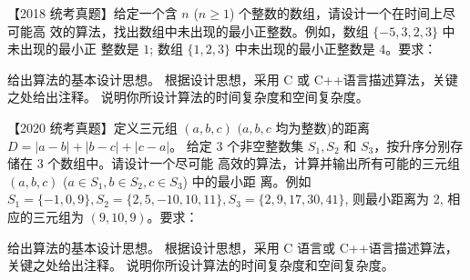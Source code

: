 \begin{qitems}
    \begin{bbox}
        \qitem 【2018 统考真题】给定一个含 $n$ ($n\geqslant 1$) 个整数的数组，请设计一个在时间上尽可能高
        效的算法，找出数组中未出现的最小正整数。例如，数组 $\{-5,3,2,3\}$ 中未出现的最小正
        整数是 $1$; 数组 $\{1,2,3\}$ 中未出现的最小正整数是 $4$。要求：
        \begin{subqitems}
            \subqitem 给出算法的基本设计思想。
            \subqitem 根据设计思想，采用 C 或 C++语言描述算法，关键之处给出注释。
            \subqitem 说明你所设计算法的时间复杂度和空间复杂度。
        \end{subqitems}
    \end{bbox}

    \begin{bbox}
        \qitem 【2020 统考真题】定义三元组 $(a,b,c)$ $(a,b,c$ 均为整数)的距离 $D=|a-b|+|b-c|+|c-a|$。
        给定 $3$ 个非空整数集 $S_1, S_2$ 和 $S_3$，按升序分别存储在 $3$ 个数组中。请设计一个尽可能
        高效的算法，计算并输出所有可能的三元组 $(a,b,c)$ ($a\in S_1, b\in S_2, c\in S_3$) 中的最小距
        离。例如 $S_1=\{-1,0,9\}, S_2=\{2,5,-10,10,11\}, S_3=\{2,9,17,30,41\}$, 则最小距离为 $2$,
        相应的三元组为 $(9,10,9)$。要求：
        \begin{subqitems}
            \subqitem 给出算法的基本设计思想。
            \subqitem 根据设计思想，采用 C 语言或 C++语言描述算法，关键之处给出注释。
            \subqitem 说明你所设计算法的时间复杂度和空间复杂度。
        \end{subqitems}
    \end{bbox}

\end{qitems}
